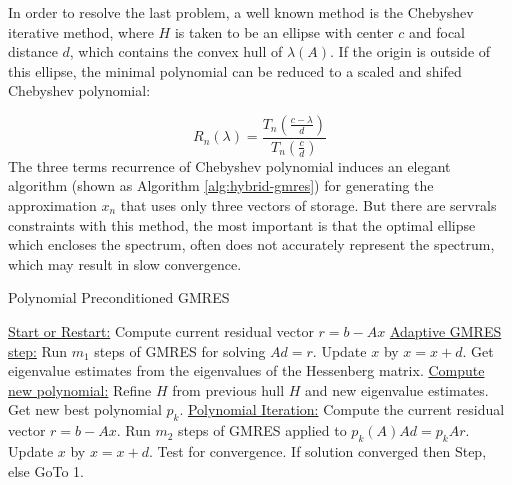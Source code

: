 {In order to resolve the last problem, a well known method is the Chebyshev iterative method, where \(H\) is taken to be an ellipse with center \(c\) and focal distance \(d\), which contains the convex hull of \(\lambda(A)\). If the origin is outside of this ellipse, the minimal polynomial can be reduced to a scaled and shifed Chebyshev polynomial:

\begin{equation}
R_n(\lambda)=\frac{T_n(\frac{c-\lambda}{d})}{ T_n (\frac{c}{d})}
\end{equation}
The three terms recurrence of Chebyshev polynomial induces an elegant algorithm (shown as Algorithm \ref{alg:hybrid-gmres}) for generating the approximation \(x_n\) that uses only three vectors of storage. But there are servrals constraints with this method, the most important is that the optimal ellipse which encloses the spectrum, often does not accurately represent the spectrum, which may result in slow convergence.

\begin{algorithm}[htbp]
	\caption{Polynomial Preconditioned GMRES}
	\label{alg:hybrid-gmres}
	\begin{algorithmic}[1]
		\State \underline{Start or Restart:}
		\State \hspace{16pt} Compute current residual vector $r=b-Ax$
		\State \underline{Adaptive GMRES step:}
		\State \hspace{16pt} Run $m_1$ steps of GMRES for solving $Ad = r$.
		\State \hspace{16pt} Update $x$ by $x=x+d$.
		\State \hspace{16pt} Get eigenvalue estimates from the eigenvalues of the Hessenberg matrix.
		\State \underline{Compute new polynomial:}
		\State \hspace{16pt} Refine $H$ from previous hull $H$ and new eigenvalue estimates.
		\State \hspace{16pt} Get new best polynomial $p_k$.
		\State \underline{Polynomial Iteration:}
		\State \hspace{16pt} Compute the current residual vector $r= b-Ax$.
		\State \hspace{16pt} Run $m_2$ steps of GMRES applied to $p_k(A)Ad=p_k{A}r$.
		\State \hspace{16pt} Update $x$ by $x=x+d$.
		\State \hspace{16pt} Test for convergence.
		\State \hspace{16pt} If solution converged then Step, else GoTo 1.
	\end{algorithmic}
\end{algorithm}

}
